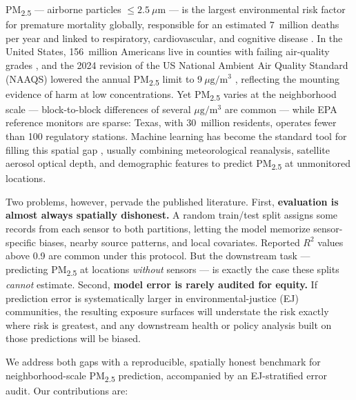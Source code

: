 \documentclass{article}
\begin{document}
PM\textsubscript{2.5} --- airborne particles $\leq\!2.5~\mu\mathrm{m}$ --- is the largest environmental risk factor for premature mortality globally, responsible for an estimated 7~million deaths per year \citep{who2024ambient} and linked to respiratory, cardiovascular, and cognitive disease \citep{pope2006health, landrigan2018lancet}. In the United States, \SI{156}{million} Americans live in counties with failing air-quality grades \citep{ala2024stateoftheair}, and the 2024 revision of the US National Ambient Air Quality Standard (NAAQS) lowered the annual PM\textsubscript{2.5} limit to $9~\mu\mathrm{g}/\mathrm{m}^3$ \citep{epa2024naaqs}, reflecting the mounting evidence of harm at low concentrations. Yet PM\textsubscript{2.5} varies at the neighborhood scale --- block-to-block differences of several $\mu\mathrm{g}/\mathrm{m}^3$ are common \citep{apte2017diesel, messier2018} --- while EPA reference monitors are sparse: Texas, with \SI{30}{million} residents, operates fewer than 100 regulatory stations. Machine learning has become the standard tool for filling this spatial gap \citep{ghahremanloo2021, zhang2024unmasking, patel2025systematic}, usually combining meteorological reanalysis, satellite aerosol optical depth, and demographic features to predict PM\textsubscript{2.5} at unmonitored locations.

Two problems, however, pervade the published literature. First, \textbf{evaluation is almost always spatially dishonest.} A random train/test split assigns some records from each sensor to both partitions, letting the model memorize sensor-specific biases, nearby source patterns, and local covariates. Reported $R^2$ values above 0.9 are common under this protocol. But the downstream task --- predicting PM\textsubscript{2.5} at locations \emph{without} sensors --- is exactly the case these splits \emph{cannot} estimate. Second, \textbf{model error is rarely audited for equity.} If prediction error is systematically larger in environmental-justice (EJ) communities, the resulting exposure surfaces will understate the risk exactly where risk is greatest, and any downstream health or policy analysis built on those predictions will be biased.

We address both gaps with a reproducible, spatially honest benchmark for neighborhood-scale PM\textsubscript{2.5} prediction, accompanied by an EJ-stratified error audit. Our contributions are:
\end{document}
